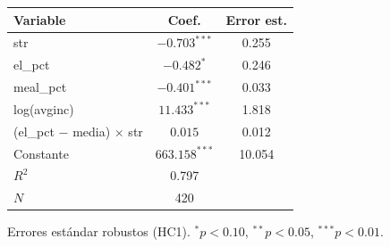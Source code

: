 
\begin{tabular}{lcc}
\toprule
Variable & Coef. & Error est.\\
\midrule
str & $-0.703^{***}$ & 0.255\\
el\_pct & $-0.482^{*}$ & 0.246\\
meal\_pct & $-0.401^{***}$ & 0.033\\
log(avginc) & $11.433^{***}$ & 1.818\\
(el\_pct $-$ media) $\times$ str & $0.015$ & 0.012\\
Constante & $663.158^{***}$ & 10.054\\
$R^2$ & 0.797 & \\
$N$ & 420 & \\
\bottomrule
\end{tabular}
\par\vspace{3pt}
{\footnotesize\parbox{0.9\linewidth}{\centering Errores est\'andar robustos (HC1). $^{*}p<0.10$, $^{**}p<0.05$, $^{***}p<0.01$.}}
